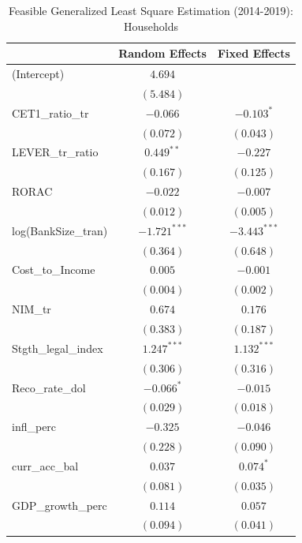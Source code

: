 
\begin{table}
\caption{Feasible Generalized Least Square Estimation (2014-2019): Households}
\begin{center}
\begin{tabular}{l c c}
\hline
 & Random Effects & Fixed Effects \\
\hline
(Intercept)         & $4.694$        &                \\
                    & $(5.484)$      &                \\
CET1\_ratio\_tr     & $-0.066$       & $-0.103^{*}$   \\
                    & $(0.072)$      & $(0.043)$      \\
LEVER\_tr\_ratio    & $0.449^{**}$   & $-0.227$       \\
                    & $(0.167)$      & $(0.125)$      \\
RORAC               & $-0.022$       & $-0.007$       \\
                    & $(0.012)$      & $(0.005)$      \\
log(BankSize\_tran) & $-1.721^{***}$ & $-3.443^{***}$ \\
                    & $(0.364)$      & $(0.648)$      \\
Cost\_to\_Income    & $0.005$        & $-0.001$       \\
                    & $(0.004)$      & $(0.002)$      \\
NIM\_tr             & $0.674$        & $0.176$        \\
                    & $(0.383)$      & $(0.187)$      \\
Stgth\_legal\_index & $1.247^{***}$  & $1.132^{***}$  \\
                    & $(0.306)$      & $(0.316)$      \\
Reco\_rate\_dol     & $-0.066^{*}$   & $-0.015$       \\
                    & $(0.029)$      & $(0.018)$      \\
infl\_perc          & $-0.325$       & $-0.046$       \\
                    & $(0.228)$      & $(0.090)$      \\
curr\_acc\_bal      & $0.037$        & $0.074^{*}$    \\
                    & $(0.081)$      & $(0.035)$      \\
GDP\_growth\_perc   & $0.114$        & $0.057$        \\
                    & $(0.094)$      & $(0.041)$      \\

\end{tabular}
\end{center}
\end{table}
